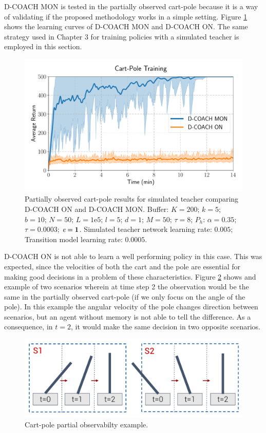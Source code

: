 D-COACH MON is tested in the partially observed cart-pole because it is a way of validating if the proposed methodology works in a simple setting. Figure \ref{fig:ld_cartpole_model} shows the learning curves of D-COACH MON and D-COACH ON. The same strategy used in Chapter 3 for training policies with a simulated teacher is employed in this section.

\begin{figure}[h]
    \centering
    \includegraphics[width=0.8\linewidth]{imagenes/cap3/cartpole_LD_model.pdf}
    \caption{Partially observed cart-pole results for simulated teacher comparing D-COACH ON and D-COACH MON.  Buffer: $K = 200$; $k=5$; $b = 10$; $N = 50$; $L=1\mathrm{e}5$; $l=5$; $d=1$; $M=50$; $\tau=8$; $P_{h}$: $\alpha = 0.35$; $\tau = 0.0003$; $\emph{e}=\textbf{1}$. Simulated teacher network learning rate: $0.005$; Transition model learning rate: $0.0005$.}
    \label{fig:ld_cartpole_model}
\end{figure}

D-COACH ON is not able to learn a well performing policy in this case. This was expected, since the velocities of both the cart and the pole are essential for making good decisions in a problem of these characteristics. Figure \ref{fig:cp_ex} shows and example of two scenarios wherein at time step 2 the observation would be the same in the partially observed cart-pole (if we only focus on the angle of the pole). In this example the angular velocity of the pole changes direction between scenarios, but an agent without memory is not able to tell the difference. As a consequence, in $t=2$, it would make the same decision in two opposite scenarios.

\begin{figure}[h]
    \centering
    \includegraphics[width=0.9\linewidth]{imagenes/cap4/cartpole_ex.pdf}
    \caption{Cart-pole partial observabilty example.}
    \label{fig:cp_ex}
\end{figure}

